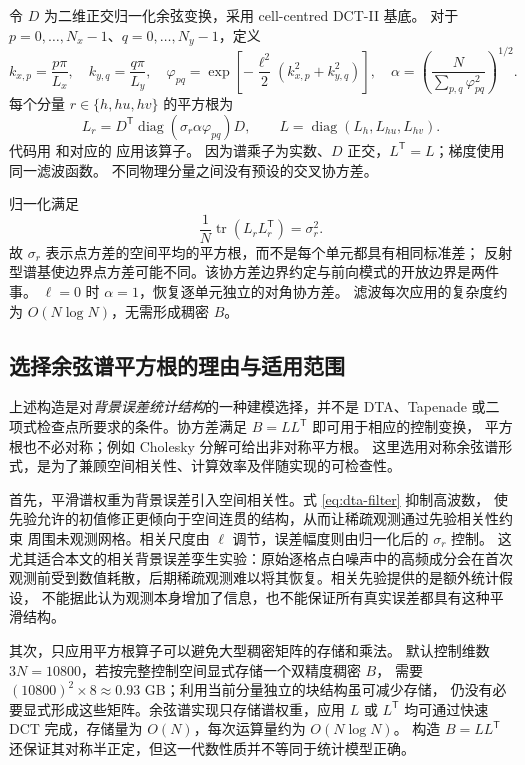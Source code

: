 \documentclass[12pt,a4paper]{article}
\newcommand{\trans}{^{\mathsf T}}
\begin{document}
令 $D$ 为二维正交归一化余弦变换，采用 cell-centred DCT-II 基底。
对于 $p=0,\ldots,N_x-1$、$q=0,\ldots,N_y-1$，定义
\begin{equation}
 k_{x,p}=\frac{p\pi}{L_x},\quad k_{y,q}=\frac{q\pi}{L_y},\quad
 \varphi_{pq}=\exp\left[-\frac{\ell^2}{2}(k_{x,p}^2+k_{y,q}^2)\right],\quad
 \alpha=\left(\frac{N}{\sum_{p,q}\varphi_{pq}^2}\right)^{1/2}.
 \label{eq:dta-filter}
\end{equation}
每个分量 $r\in\{h,hu,hv\}$ 的平方根为
\begin{equation}
 L_r=D\trans\operatorname{diag}(\sigma_r\alpha\varphi_{pq})D,
 \qquad L=\operatorname{diag}(L_h,L_{hu},L_{hv}).
 \label{eq:dta-covariance-root}
\end{equation}
代码用  和对应的  应用该算子。
因为谱乘子为实数、$D$ 正交，$L\trans=L$；梯度使用同一滤波函数。
不同物理分量之间没有预设的交叉协方差。

归一化满足
\begin{equation}
 \frac1N\operatorname{tr}(L_rL_r\trans)=\sigma_r^2.
 \label{eq:dta-covariance-normalization}
\end{equation}
故 $\sigma_r$ 表示点方差的空间平均的平方根，而不是每个单元都具有相同标准差；
反射型谱基使边界点方差可能不同。该协方差边界约定与前向模式的开放边界是两件事。
$\ell=0$ 时 $\alpha=1$，恢复逐单元独立的对角协方差。
滤波每次应用的复杂度约为 $O(N\log N)$，无需形成稠密 $B$。

\subsection{选择余弦谱平方根的理由与适用范围}

上述构造是对\emph{背景误差统计结构}的一种建模选择，并不是 DTA、Tapenade
或二项式检查点所要求的条件。协方差满足 $B=LL\trans$ 即可用于相应的控制变换，
平方根也不必对称；例如 Cholesky 分解可给出非对称平方根。
这里选用对称余弦谱形式，是为了兼顾空间相关性、计算效率及伴随实现的可检查性。

首先，平滑谱权重为背景误差引入空间相关性。式 \eqref{eq:dta-filter} 抑制高波数，
使先验允许的初值修正更倾向于空间连贯的结构，从而让稀疏观测通过先验相关性约束
周围未观测网格。相关尺度由 $\ell$ 调节，误差幅度则由归一化后的 $\sigma_r$ 控制。
这尤其适合本文的相关背景误差孪生实验：原始逐格点白噪声中的高频成分会在首次
观测前受到数值耗散，后期稀疏观测难以将其恢复。相关先验提供的是额外统计假设，
不能据此认为观测本身增加了信息，也不能保证所有真实误差都具有这种平滑结构。

其次，只应用平方根算子可以避免大型稠密矩阵的存储和乘法。
默认控制维数 $3N=10800$，若按完整控制空间显式存储一个双精度稠密 $B$，
需要 $(10800)^2\times8\approx0.93$ GB；利用当前分量独立的块结构虽可减少存储，
仍没有必要显式形成这些矩阵。余弦谱实现只存储谱权重，应用 $L$ 或 $L\trans$
均可通过快速 DCT 完成，存储量为 $O(N)$，每次运算量约为 $O(N\log N)$。
构造 $B=LL\trans$ 还保证其对称半正定，但这一代数性质并不等同于统计模型正确。
\end{document}
